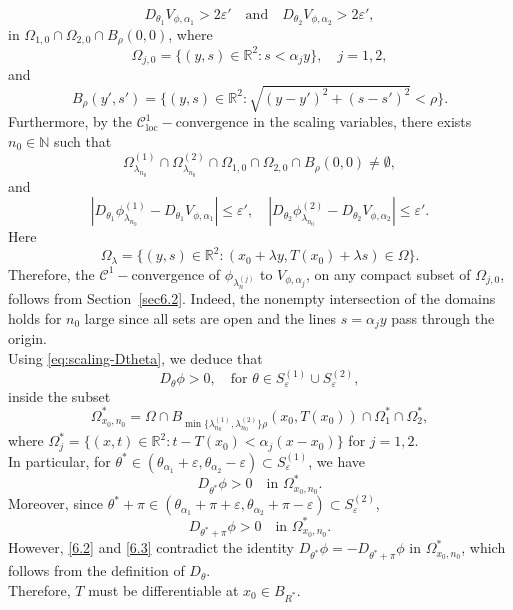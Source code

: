 \documentclass[
  sn-mathphys-num,
  colorlinks,
  linkcolor=darkmagenta,
  citecolor=rufous,
  urlcolor=zaffre,
  hypertexnames=false
]{sn-jnl}
\numberwithin{equation}{section}
\begin{document}
$$
D_{\theta_1}V_{\phi,\alpha_1} > 2\varepsilon' \quad \text{and} \quad D_{\theta_2}V_{\phi,\alpha_2} > 2\varepsilon',
$$
in $\Omega_{1,0} \cap \Omega_{2,0} \cap B_\rho(0,0)$, where
$$
\Omega_{j,0} = \{(y,s) \in \mathbb{R}^2 : s < \alpha_j y\}, \quad j=1,2,
$$
and
$$
B_\rho(y',s') = \{(y,s) \in \mathbb{R}^2 : \sqrt{(y-y')^2 + (s-s')^2} < \rho\}.
$$
Furthermore, by the $\mathcal{C}^1_{\mathrm{loc}}-$convergence in the scaling variables, there exists $n_0 \in \mathbb{N}$ such that
$$
\Omega_{\lambda_{n_0}}^{(1)} \cap \Omega_{\lambda_{n_0}}^{(2)} \cap \Omega_{1,0} \cap \Omega_{2,0} \cap B_\rho(0,0) \neq \emptyset,
$$
and
$$
|D_{\theta_1}\phi_{\lambda_{n_0}}^{(1)} - D_{\theta_1}V_{\phi,\alpha_1}| \leq \varepsilon', \quad |D_{\theta_2}\phi_{\lambda_{n_0}}^{(2)} - D_{\theta_2}V_{\phi,\alpha_2}| \leq \varepsilon'.
$$
Here
$$
\Omega_\lambda = \{(y,s) \in \mathbb{R}^2 : (x_0 + \lambda y, T(x_0) + \lambda s) \in \Omega\}.
$$
Therefore,  the $\mathcal{C}^1-$convergence of $\phi_{\lambda_n^{(j)}}$ to $V_{\phi,\alpha_j}$, on any compact subset of $\Omega_{j,0}$, follows from Section~\ref{sec6.2}. Indeed, the nonempty intersection of the domains holds for $n_0$ large since all sets are open and the lines $s=\alpha_j y$ pass through the origin.\\
Using \eqref{eq:scaling-Dtheta}, we deduce that 
\begin{equation}\label{6.1}
D_\theta\phi > 0, \quad \text{for } \theta \in S_\varepsilon^{(1)} \cup S_\varepsilon^{(2)},
\end{equation}
inside the subset 
$$
\Omega_{x_0,n_0}^* = \Omega \cap B_{\min\{\lambda_{n_0}^{(1)}, \lambda_{n_0}^{(2)}\}\rho}(x_0,T(x_0)) \cap \Omega_1^* \cap \Omega_2^*,
$$
where $\Omega_j^* = \{(x,t) \in \mathbb{R}^2 : t - T(x_0) < \alpha_j(x - x_0)\}$ for $j=1,2$.\\
In particular, for $\theta^* \in (\theta_{\alpha_1} + \varepsilon, \theta_{\alpha_2} - \varepsilon) \subset S_\varepsilon^{(1)}$, we have
\begin{equation}\label{6.2}
D_{\theta^*}\phi > 0 \quad \text{in } \Omega_{x_0,n_0}^*.
\end{equation}
Moreover, since $\theta^* + \pi \in (\theta_{\alpha_1} + \pi + \varepsilon, \theta_{\alpha_2} + \pi - \varepsilon) \subset S_\varepsilon^{(2)}$,
\begin{equation}\label{6.3}
D_{\theta^* + \pi}\phi > 0 \quad \text{in } \Omega_{x_0,n_0}^*.
\end{equation}
However, \eqref{6.2} and \eqref{6.3} contradict the identity $D_{\theta^*}\phi = -D_{\theta^* + \pi}\phi$ in $\Omega_{x_0,n_0}^*$, which follows from the definition of $D_\theta$.\\ Therefore, $T$ must be differentiable at $x_0 \in B_{R^*}$.
\end{document}
